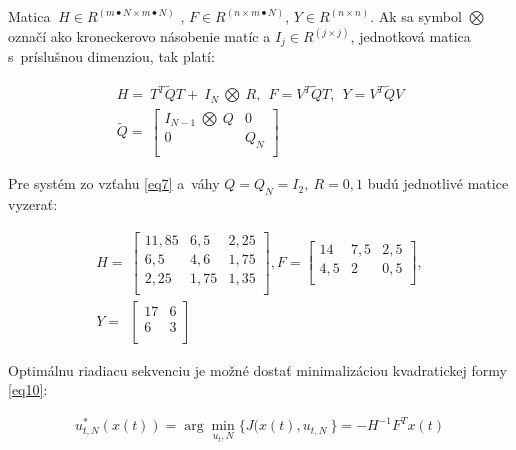 Matica \(\ H \in R^{(m \bullet N \times m \bullet N)}\) ,
\(F \in R^{(n \times m \bullet N)}\), \(Y \in R^{(n \times n)}\). Ak sa
symbol \(\bigotimes\) označí ako kroneckerovo násobenie matíc a
\(I_{j} \in R^{(j \times j)}\), jednotková matica s~príslušnou
dimenziou, tak platí:

\begin{equation} \label{eq11}
\begin{split}
H = \ T^{T}\tilde{Q}T + \ I_{N}\ \bigotimes\ R,\ \ F = V^{T}\tilde{Q}T,\ \ Y = V^{T}\tilde{Q}V \\
\tilde{Q} = \ \begin{bmatrix}
I_{N - 1}\ \bigotimes\ Q & 0 \\
0 & Q_{N} \\
\end{bmatrix}
\end{split}
\end{equation}

Pre systém zo vzťahu \ref{eq7} a~váhy \(Q = Q_{N} = I_{2},\ R = 0,1\) budú
jednotlivé matice vyzerať:

\begin{equation} \label{eq12}
\begin{split}
H = \ \begin{bmatrix}
11,85 & 6,5 & 2,25 \\
6,5 & 4,6 & 1,75 \\
2,25 & 1,75 & 1,35 \\
\end{bmatrix}, F = \begin{bmatrix}
14 & 7,5 & 2,5 \\
4,5 & 2 & 0,5 \\
\end{bmatrix}, \\
Y = \ \ \begin{bmatrix}
17 & 6 \\
6 & 3 \\
\end{bmatrix}
\end{split}
\end{equation}

Optimálnu riadiacu sekvenciu je možné dostať minimalizáciou kvadratickej
formy \ref{eq10}:

\begin{equation} \label{eq13}
\begin{split}
u_{t,N}^{*}\left( x\left( t \right) \right) = \arg{\min_{u_t,N}{\{ J(x\left( t \right),u_{t,N}\ \}}} = - H^{- 1}F^{T}x(t)
\end{split}
\end{equation}

